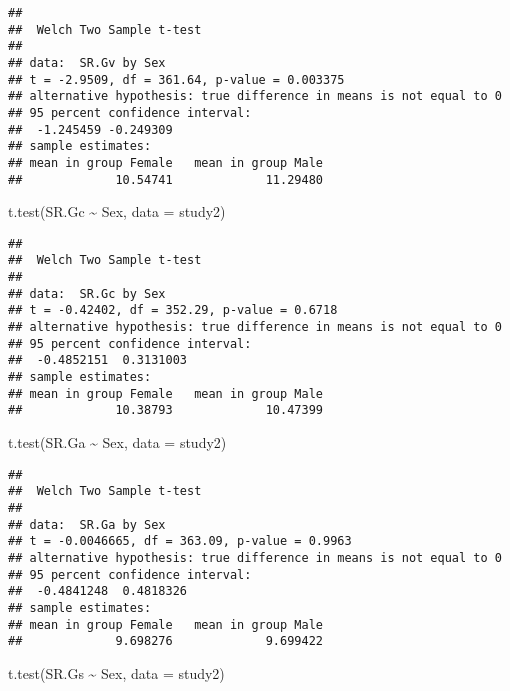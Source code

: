 \documentclass[
]{article}
\newenvironment{Shaded}{\begin{snugshade}}{\end{snugshade}}
\newcommand{\AttributeTok}[1]{\textcolor[rgb]{0.77,0.63,0.00}{#1}}
\newcommand{\FunctionTok}[1]{\textcolor[rgb]{0.00,0.00,0.00}{#1}}
\newcommand{\NormalTok}[1]{#1}
\newcommand{\SpecialCharTok}[1]{\textcolor[rgb]{0.00,0.00,0.00}{#1}}
\begin{document}
\begin{verbatim}
## 
##  Welch Two Sample t-test
## 
## data:  SR.Gv by Sex
## t = -2.9509, df = 361.64, p-value = 0.003375
## alternative hypothesis: true difference in means is not equal to 0
## 95 percent confidence interval:
##  -1.245459 -0.249309
## sample estimates:
## mean in group Female   mean in group Male 
##             10.54741             11.29480
\end{verbatim}

\begin{Shaded}
\begin{Highlighting}[]
\FunctionTok{t.test}\NormalTok{(SR.Gc }\SpecialCharTok{\textasciitilde{}}\NormalTok{ Sex, }\AttributeTok{data =}\NormalTok{ study2)}
\end{Highlighting}
\end{Shaded}

\begin{verbatim}
## 
##  Welch Two Sample t-test
## 
## data:  SR.Gc by Sex
## t = -0.42402, df = 352.29, p-value = 0.6718
## alternative hypothesis: true difference in means is not equal to 0
## 95 percent confidence interval:
##  -0.4852151  0.3131003
## sample estimates:
## mean in group Female   mean in group Male 
##             10.38793             10.47399
\end{verbatim}

\begin{Shaded}
\begin{Highlighting}[]
\FunctionTok{t.test}\NormalTok{(SR.Ga }\SpecialCharTok{\textasciitilde{}}\NormalTok{ Sex, }\AttributeTok{data =}\NormalTok{ study2)}
\end{Highlighting}
\end{Shaded}

\begin{verbatim}
## 
##  Welch Two Sample t-test
## 
## data:  SR.Ga by Sex
## t = -0.0046665, df = 363.09, p-value = 0.9963
## alternative hypothesis: true difference in means is not equal to 0
## 95 percent confidence interval:
##  -0.4841248  0.4818326
## sample estimates:
## mean in group Female   mean in group Male 
##             9.698276             9.699422
\end{verbatim}

\begin{Shaded}
\begin{Highlighting}[]
\FunctionTok{t.test}\NormalTok{(SR.Gs }\SpecialCharTok{\textasciitilde{}}\NormalTok{ Sex, }\AttributeTok{data =}\NormalTok{ study2)}
\end{Highlighting}
\end{Shaded}
\end{document}
